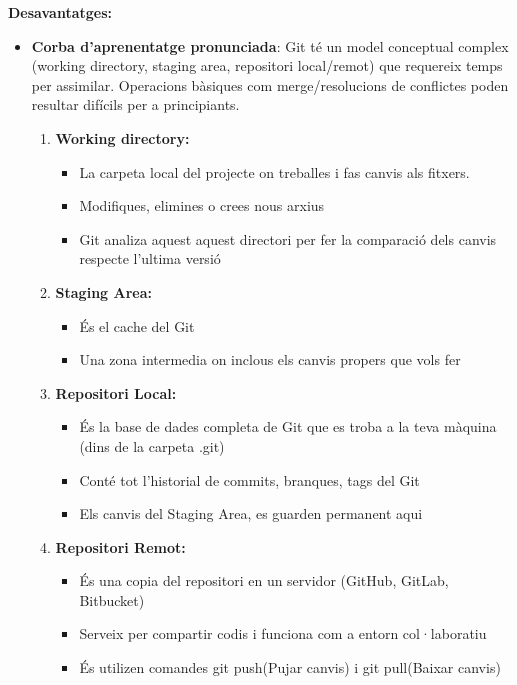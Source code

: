\textbf{Desavantatges:}
\begin{itemize}



\item \textbf{Corba d'aprenentatge pronunciada}: Git té un model conceptual complex (working directory, staging area, repositori local/remot) que requereix temps per assimilar. Operacions bàsiques com merge/resolucions de conflictes poden resultar difícils per a principiants.

      \begin{enumerate}
        \item \textbf{Working directory:}
         \begin{itemize}
            \item La carpeta local del projecte on treballes i fas canvis als fitxers.
            \item Modifiques, elimines o crees nous arxius
            \item Git analiza aquest aquest directori per fer la comparació dels canvis respecte l'ultima versió
          \end{itemize}

        \item \textbf{Staging Area:}
         \begin{itemize}
            \item És el cache del Git
            \item Una zona intermedia on inclous els canvis propers que vols fer
          \end{itemize}

        \item \textbf{Repositori Local:}
        \begin{itemize}
            \item És la base de dades completa de Git que es troba a la teva màquina (dins de la carpeta .git)
            \item Conté tot l'historial de commits, branques, tags del Git
            \item Els canvis del Staging Area, es guarden permanent aqui
          \end{itemize}
        \item \textbf{Repositori Remot:}
        \begin{itemize}
            \item És una copia del repositori en un servidor (GitHub, GitLab, Bitbucket)
            \item Serveix per compartir codis i funciona com a entorn col·laboratiu
            \item És utilizen comandes git push(Pujar canvis) i git pull(Baixar canvis)
          \end{itemize}
       \end{enumerate}



\end{itemize}
